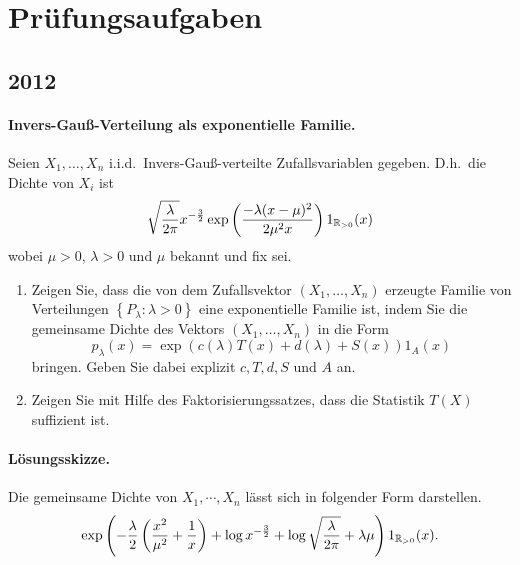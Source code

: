 
\section{Prüfungsaufgaben}
\subsection{2012}

\paragraph{Invers-Gauß-Verteilung als exponentielle Familie.}
Seien $X_1,\ldots,X_n$ i.i.d.\ Invers-Gauß-verteilte Zufallsvariablen gegeben. D.h.\ die Dichte
von $X_i$ ist 
\begin{equation*}
    \sqrt{\frac{\lambda}{2\pi}} x^{-\frac{3}{2}} \exp\left( \frac{-\lambda(x-\mu)^2}{2\mu^2 x} \right) 1_{\mathbb R_{>0}} (x)
\end{equation*}
wobei $\mu>0$, $\lambda>0$ und $\mu$ bekannt und fix sei.
\begin{enumerate}
    \item Zeigen Sie, dass die von dem Zufallsvektor $( X_1,\ldots,X_n)$
        erzeugte Familie von Verteilungen $\left\{ P_\lambda : \lambda>0
        \right\}$ eine exponentielle Familie ist, indem Sie die gemeinsame
        Dichte des Vektors $(X_1,\ldots,X_n)$ in die Form
        \begin{equation*}
            p_\lambda(x) = \exp\left( c(\lambda) T(x) + d(\lambda) + S(x) \right)1_A (x)
        \end{equation*}
        bringen. Geben Sie dabei explizit $c,T,d,S$ und $A$ an.
    \item Zeigen Sie mit Hilfe des Faktorisierungssatzes, dass die Statistik
        $T(X)$ suffizient ist.
\end{enumerate}

\paragraph*{Lösungsskizze.} Die gemeinsame Dichte von $X_1, \cdots, X_n$ 
lässt sich in folgender Form darstellen.
\begin{equation*}
    \exp\left(  -\frac{\lambda}{2}\left( \frac{x^2}{\mu^2} + \frac{1}{x} \right)    
    + \log x^{-\frac{3}{2}} + \log \sqrt{\frac{\lambda}{2\pi}} + 
    \lambda\mu  \right)1_{\mathbb R_{>0}}(x).
\end{equation*}




